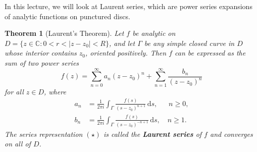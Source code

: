 \documentclass[10pt]{article}
\newcommand{\C}{\mathbb{C}}
\newcommand{\dd}{\,\mathrm{d}}
\theoremstyle{newstyle}
\newtheorem{thm}{Theorem}[section]
\begin{document}
In this lecture, we will look at Laurent series, which are power series expansions of analytic functions 
on punctured discs. 

\begin{thm}[Laurent's Theorem]
Let $f$ be analytic on $D = \{z \in \C : 0 < r < |z-z_0| < R\}$, and let $\Gamma$ be any 
simple closed curve in $D$ whose interior contains $z_0$, oriented positively. Then 
$f$ can be expressed as the sum of two power series 
\[ f(z) = \sum_{n=0}^\infty a_n (z-z_0)^n + \sum_{n=1}^\infty \frac{b_n}{(z-z_0)^n} \tag{$\star$} \]
for all $z \in D$, where 
\begin{align*}
    a_n &= \frac{1}{2\pi i} \int_\Gamma \frac{f(s)}{(s-z_0)^{n+1}}\dd s, \;\;\quad n \geq 0, \\
    b_n &= \frac{1}{2\pi i} \int_\Gamma \frac{f(s)}{(s-z_0)^{-n+1}}\dd s, \quad n \geq 1.
\end{align*}
The series representation $(\star)$ is called the {\bf Laurent series} of $f$ and converges on all of $D$.
\end{thm}
\end{document}
